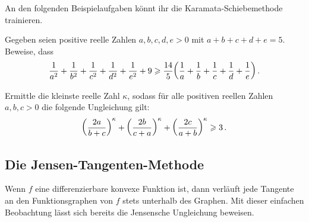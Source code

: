 An den folgenden Beispielaufgaben könnt ihr die Karamata-Schiebemethode trainieren.

\begin{aufgabe*}\label{aufgabe:KaramataSchieben}
	Gegeben seien positive reelle Zahlen $a,b,c,d,e>0$ mit $a+b+c+d+e=5$. Beweise, dass
	\begin{equation*}
		\frac1{a^2}+\frac1{b^2}+\frac1{c^2}+\frac1{d^2}+\frac1{e^2}+9\geqslant \frac{14}5\parens*{\frac1a+\frac1b+\frac1c+\frac1d+\frac1e}\,.
	\end{equation*}
\end{aufgabe*}
\begin{aufgabe*}[**]\label{aufgabe:log3log2}
	Ermittle die kleinste reelle Zahl $\kappa$, sodass für alle positiven reellen Zahlen $a,b,c>0$ die folgende Ungleichung gilt:
	\begin{equation*}
		\parens*{\frac{2a}{b+c}}^\kappa+\parens*{\frac{2b}{c+a}}^\kappa+\parens*{\frac{2c}{a+b}}^\kappa\geqslant 3\,.
	\end{equation*}
\end{aufgabe*}

\subsection*{Die Jensen-Tangenten-Methode}
Wenn $f$ eine differenzierbare konvexe Funktion ist, dann verläuft jede Tangente an den Funktionsgraphen von $f$ stets unterhalb des Graphen. Mit dieser einfachen Beobachtung lässt sich bereits die Jensensche Ungleichung beweisen.

